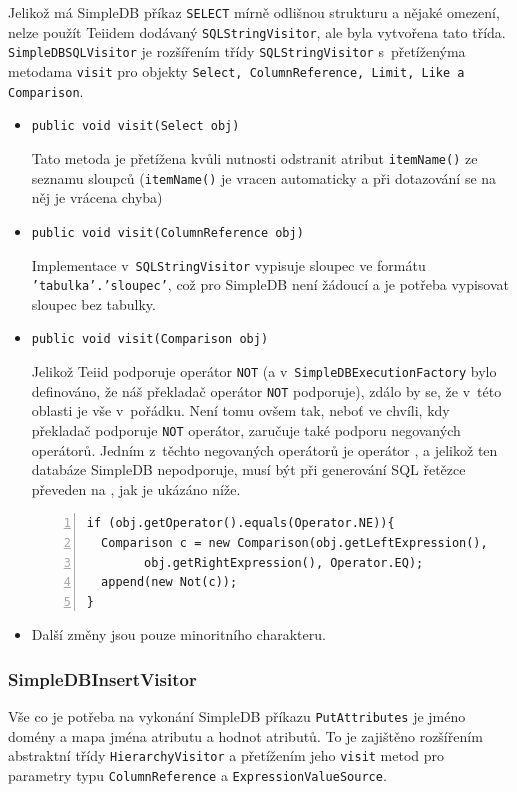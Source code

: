\documentclass[oneside,12pt]{fithesis2}
\begin{document}
Jelikož má SimpleDB příkaz \texttt{SELECT} mírně odlišnou strukturu a nějaké omezení, nelze použít Teiidem dodávaný \texttt{SQLStringVisitor}, ale byla vytvořena tato třída.
\texttt{SimpleDBSQLVisitor} je rozšířením třídy \texttt{SQLStringVisitor} s~přetíženýma metodama \texttt{visit} pro objekty \texttt{Select, ColumnReference, Limit, Like a Comparison}.
\begin{itemize}
 \item \texttt{public void visit(Select obj)}
 
 Tato metoda je přetížena kvůli nutnosti odstranit atribut \texttt{itemName()} ze seznamu sloupců (\texttt{itemName()} je vracen automaticky a při dotazování se na něj je vrácena chyba)
 \item \texttt{public void visit(ColumnReference obj)}
 
 Implementace v~\texttt{SQLStringVisitor} vypisuje sloupec ve formátu \texttt{'tabulka'\allowbreak.'sloupec'}, což pro SimpleDB není žádoucí a je potřeba vypisovat sloupec bez tabulky.
 
 \item \texttt{public void visit(Comparison obj)}
 
 Jelikož Teiid podporuje operátor \texttt{NOT} (a v~\texttt{SimpleDBExecution\allowbreak Factory} bylo definováno, že náš překladač operátor \texttt{NOT} podporuje), zdálo by se, že v~této oblasti je vše v~pořádku. Není tomu ovšem tak, neboť ve chvíli, kdy překladač podporuje \texttt{NOT} operátor, zaručuje také podporu negovaných operátorů. Jedním z~těchto negovaných operátorů je operátor , a jelikož ten databáze SimpleDB nepodporuje, musí být při generování SQL řetězce převeden na , jak je ukázáno níže.
 \begin{Verbatim}[fontsize=\small,numbers=left]
if (obj.getOperator().equals(Operator.NE)){
  Comparison c = new Comparison(obj.getLeftExpression(), 
		obj.getRightExpression(), Operator.EQ);
  append(new Not(c));
}
 \end{Verbatim}
\item Další změny jsou pouze minoritního charakteru.
\end{itemize}

\subsubsection*{SimpleDBInsertVisitor}
Vše co je potřeba na vykonání SimpleDB příkazu \texttt{PutAttributes} je jméno domény a mapa jména atributu a hodnot atributů. To je zajištěno rozšířením abstraktní třídy \texttt{HierarchyVisitor} a přetížením jeho \texttt{visit} metod pro parametry typu \texttt{ColumnReference} a \texttt{ExpressionValueSource}.
\end{document}
